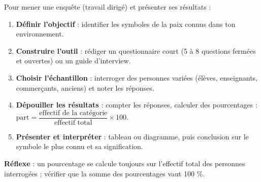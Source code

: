 \documentclass[11pt]{article}
\begin{document}
\begin{methode}
Pour mener une enquête (travail dirigé) et présenter ses résultats :
\begin{enumerate}
\item \textbf{Définir l'objectif} : identifier les symboles de la paix connus dans ton environnement.
\item \textbf{Construire l'outil} : rédiger un questionnaire court (5 à 8 questions fermées et ouvertes) ou un guide d'interview.
\item \textbf{Choisir l'échantillon} : interroger des personnes variées (élèves, enseignants, commerçants, anciens) et noter les réponses.
\item \textbf{Dépouiller les résultats} : compter les réponses, calculer des pourcentages : $\text{part} = \dfrac{\text{effectif de la catégorie}}{\text{effectif total}} \times 100$.
\item \textbf{Présenter et interpréter} : tableau ou diagramme, puis conclusion sur le symbole le plus connu et sa signification.
\end{enumerate}
\textbf{Réflexe} : un pourcentage se calcule toujours sur l'effectif total des personnes interrogées ; vérifier que la somme des pourcentages vaut 100 \%.
\end{methode}
\end{document}
